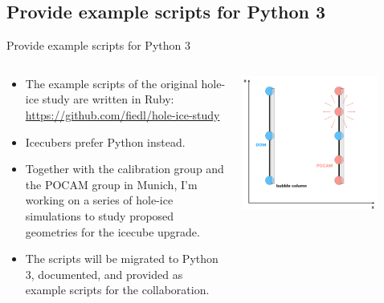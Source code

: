 \subsection{\tobedone Provide example scripts for Python 3}
\begin{frame}[fragile]{\tobedone Provide example scripts for Python 3}
  \begin{columns}
    \begin{column}{0.5\textwidth}
      \begin{itemize}
        \item The example scripts of the original hole-ice study are written in Ruby: \url{https://github.com/fiedl/hole-ice-study}
        \item Icecubers prefer Python instead.
        \item[\inprogress] Together with the calibration group and the POCAM group in Munich, I'm working on a series of hole-ice simulations to study proposed geometries for the icecube upgrade.
        \item[\tobedone] The scripts will be migrated to Python 3, documented, and provided as example scripts for the collaboration.
      \end{itemize}
    \end{column}
    \begin{column}{0.5\textwidth}
      \includegraphics[width=0.8\textwidth]{img/pocamscenario-right}
    \end{column}
  \end{columns}

  \bigskip {} \bigskip

\end{frame}

